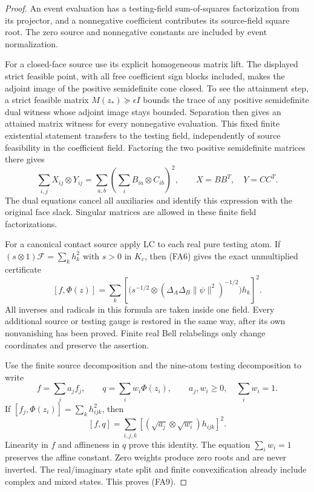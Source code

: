 \begin{proof}
An event evaluation has a testing-field sum-of-squares factorization
from its projector, and a nonnegative coefficient contributes its
source-field square root.  The zero source and nonnegative constants
are included by event normalization.

For a closed-face source use its explicit homogeneous matrix lift.
The displayed strict feasible point, with all free coefficient sign
blocks included, makes the adjoint image of the positive semidefinite
cone closed.  To see the attainment step, a strict feasible matrix
$M(z_*)\succeq\epsilon I$ bounds the trace of any positive
semidefinite dual witness whose adjoint image stays bounded.
Separation then gives an attained matrix witness for every nonnegative
evaluation.  This fixed finite existential statement transfers to the
testing field, independently of source feasibility in the coefficient
field.  Factoring the two positive semidefinite matrices there gives
\[
 \sum_{i,j}X_{ij}\otimes Y_{ij}
   =\sum_{a,b}\left(\sum_i B_{ia}\otimes C_{ib}\right)^2,
       \qquad X=BB^T,\quad Y=CC^T.                           \tag{FA10}
\]
The dual equations cancel all auxiliaries and identify this expression
with the original face slack.  Singular matrices are allowed in these
finite field factorizations.

For a canonical contact source apply LC to each real pure testing atom.
If $(s\otimes1)\mathcal F=\sum_k h_k^2$ with $s>0$ in $K_c$,
then (FA6) gives the exact unmultiplied certificate
\[
 [f,\Phi(z)]=\sum_k\left[
   \bigl(s^{-1/2}\otimes
        (\Delta_A\Delta_B\|\psi\|^2)^{-1/2}\bigr)h_k\right]^2.
                                                               \tag{FA11}
\]
All inverses and radicals in this formula are taken inside one field.
Every additional source or testing gauge is restored in the same
way, after its own nonvanishing has been proved.  Finite real Bell
relabelings only change coordinates and preserve the assertion.

Use the finite source decomposition and the nine-atom testing
decomposition to write
\[
 f=\sum_j a_j f_j,\qquad q=\sum_i w_i\Phi(z_i),\qquad
 a_j,w_i\ge0,\quad\sum_iw_i=1.
\]
If $[f_j,\Phi(z_i)]=\sum_k h_{ijk}^2$, then
\[
 [f,q]=\sum_{i,j,k}
       \left[(\sqrt{a_j}\otimes\sqrt{w_i})h_{ijk}\right]^2.
                                                               \tag{FA12}
\]
Linearity in $f$ and affineness in $q$ prove this identity.  The equation
$\sum_iw_i=1$ preserves the affine constant.  Zero weights produce
zero roots and are never inverted.  The real/imaginary state split and
finite convexification already include complex and mixed states.
This proves (FA9).


\end{proof}
